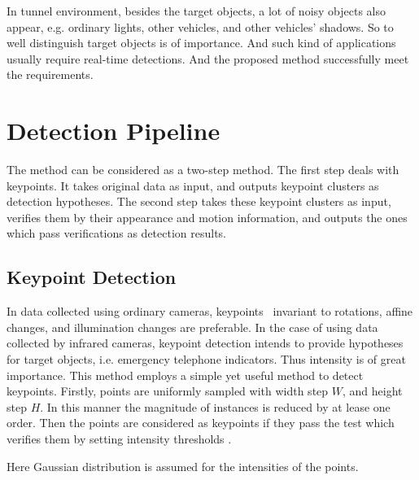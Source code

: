  In tunnel environment, besides the target objects, a lot of noisy objects also appear, e.g. ordinary lights, other vehicles, and other vehicles' shadows. So to well distinguish target objects is of importance. And such kind of applications usually require real-time detections. And the proposed method successfully meet the requirements.

\section{Detection Pipeline}
\label{pip}
The method can be considered as a two-step method. The first step deals with keypoints. It
takes original data as input, and outputs keypoint clusters as detection hypotheses. The second
step takes these keypoint clusters as input, verifies them by their appearance and motion
information, and outputs the ones which pass verifications as detection results.

\subsection{Keypoint Detection}
In data collected using ordinary cameras, keypoints~\cite{o2,o12} invariant to rotations, affine changes, and illumination changes are preferable. In the case of using data collected by infrared cameras, keypoint detection intends to provide hypotheses for target objects, i.e. emergency telephone indicators. Thus intensity is of great importance. This method employs a simple yet useful method to detect keypoints. Firstly, points are uniformly sampled with width step $W$, and height step $H$. In this manner the magnitude of instances is reduced by  at lease one order. Then the points are considered as keypoints if they pass the test which verifies them by setting intensity thresholds .

Here Gaussian distribution is assumed for the intensities of the points.


